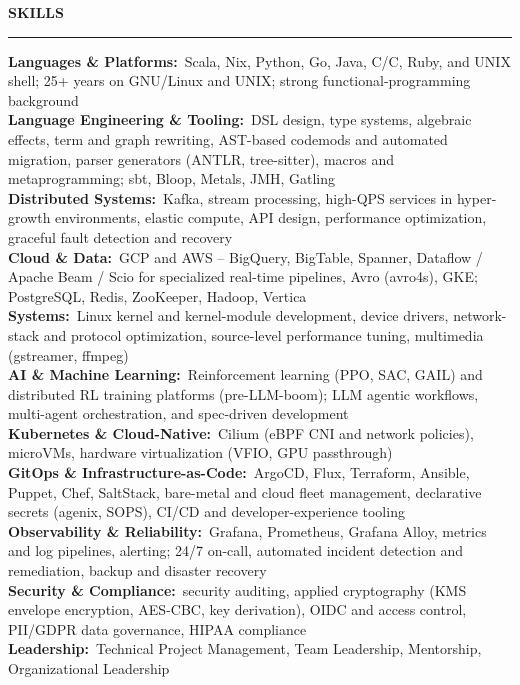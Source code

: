 \documentclass[11pt,letterpaper]{article}
\makeatletter
\newcommand{\area}[2]{{\bfseries\color{accent}#1:}~#2}
\newcommand{\header}[1]{%
  \vspace{6pt}%
  {\large\bfseries\color{accent}\MakeUppercase{#1}}\par\nobreak\vspace{-3pt}%
  {\color{accent}\rule{\linewidth}{0.9pt}}\par\nobreak\vspace{3pt}%
  \@afterheading}
\newcommand{\CPP}{C\nolinebreak[4]\hspace{-.05em}\raisebox{.22ex}{\footnotesize\bf ++}}
\makeatother
\begin{document}
\header{Skills}
\noindent
\area{Languages \& Platforms}{Scala, Nix, Python, Go, Java, C/\CPP, Ruby, and UNIX shell; 25+ years on GNU/Linux and UNIX; strong functional-programming background}\\
\area{Language Engineering \& Tooling}{DSL design, type systems, algebraic effects, term and graph rewriting, AST-based codemods and automated migration, parser generators (ANTLR, tree-sitter), macros and metaprogramming; sbt, Bloop, Metals, JMH, Gatling}\\
\area{Distributed Systems}{Kafka, stream processing, high-QPS services in hyper-growth environments, elastic compute, API design, performance optimization, graceful fault detection and recovery}\\
\area{Cloud \& Data}{GCP and AWS -- BigQuery, BigTable, Spanner, Dataflow / Apache Beam / Scio for specialized real-time pipelines, Avro (avro4s), GKE; PostgreSQL, Redis, ZooKeeper, Hadoop, Vertica}\\
\area{Systems}{Linux kernel and kernel-module development, device drivers, network-stack and protocol optimization, source-level performance tuning, multimedia (gstreamer, ffmpeg)}\\
\area{AI \& Machine Learning}{Reinforcement learning (PPO, SAC, GAIL) and distributed RL training platforms (pre-LLM-boom); LLM agentic workflows, multi-agent orchestration, and spec-driven development}\\
\area{Kubernetes \& Cloud-Native}{Cilium (eBPF CNI and network policies), microVMs, hardware virtualization (VFIO, GPU passthrough)}\\
\area{GitOps \& Infrastructure-as-Code}{ArgoCD, Flux, Terraform, Ansible, Puppet, Chef, SaltStack, bare-metal and cloud fleet management, declarative secrets (agenix, SOPS), CI/CD and developer-experience tooling}\\
\area{Observability \& Reliability}{Grafana, Prometheus, Grafana Alloy, metrics and log pipelines, alerting; 24/7 on-call, automated incident detection and remediation, backup and disaster recovery}\\
\area{Security \& Compliance}{security auditing, applied cryptography (KMS envelope encryption, AES-CBC, key derivation), OIDC and access control, PII/GDPR data governance, HIPAA compliance}\\
\area{Leadership}{Technical Project Management, Team Leadership, Mentorship, Organizational Leadership}

\newpage
\end{document}
